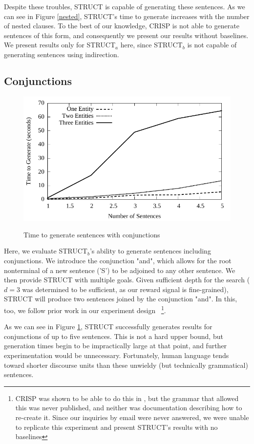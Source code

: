 Despite these troubles, STRUCT is capable of generating these sentences.  As we can
see in Figure \ref{nested}, STRUCT's time to generate increases with the number of
nested clauses.  To the best of our knowledge, CRISP is not able to generate sentences
of this form, and consequently we present our results without baselines.  We present
results only for STRUCT$_a$ here, since STRUCT$_b$ is not capable of generating
sentences using indirection.

\subsection{Conjunctions}

\begin{figure}
\centering
\includegraphics[width=0.7 \linewidth]{../analysis/struct/conjunction/conjunction.pdf}
\label{graph-conjunction}
\caption{Time to generate sentences with conjunctions}
\end{figure}

Here, we evaluate STRUCT$_b$'s ability to generate sentences including
conjunctions.  We introduce the conjunction "and", which allows for the
root nonterminal of a new sentence ('S') to be adjoined to any other sentence.
We then provide STRUCT with multiple goals.  Given sufficient depth for the
search ($d=3$ was determined to be sufficient, as our reward signal is fine-grained),
STRUCT will produce two sentences joined by the conjunction "and".  In this, too,
we follow prior work in our experiment design \cite{koller_experiences_2011}
~\footnote{CRISP was shown to be able to do this in \cite{koller_experiences_2011},
but the grammar that allowed this was never published, and neither was documentation
describing how to re-create it.  Since our inquiries by email were never answered, we
were unable to replicate this experiment and present STRUCT's results with no
baselines}.

As we can see in Figure \ref{graph-conjunction}, STRUCT successfully generates results
for conjunctions of up to five sentences.  This is not a hard upper bound, but
generation times begin to be impractically large at that point, and further
experimentation would be unnecessary.  Fortunately, human language tends toward
shorter discourse units than these unwieldy (but technically grammatical) sentences.

